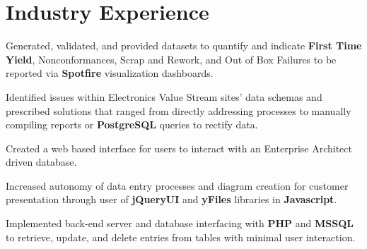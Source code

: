 \documentclass[letterpaper]{deedy-resume} %
\begin{document}
\begin{minipage}[t]{0.66\textwidth} %


\section{Industry Experience}



\vspace{\topsep} %
\begin{tightitemize}
\item  Generated, validated, and provided datasets to quantify and indicate \textbf{First Time Yield}, Nonconformances, Scrap and Rework, and Out of Box Failures to be reported via \textbf{Spotfire} visualization dashboards.
\item Identified issues within Electronics Value Stream sites' data schemas and prescribed solutions that ranged from directly addressing processes to manually compiling reports or \textbf{PostgreSQL} queries to rectify data.
\end{tightitemize}

\begin{tightitemize}
\item Created a web based interface for users to interact with an Enterprise Architect driven database.
\item Increased autonomy of data entry processes and diagram creation for customer presentation through user of \textbf{jQueryUI} and \textbf{yFiles} libraries in \textbf{Javascript}.
\item Implemented back-end server and database interfacing with \textbf{PHP} and \textbf{MSSQL} to retrieve, update, and delete entries from tables with minimal user interaction.
\end{tightitemize}


\end{minipage}
\end{document}
